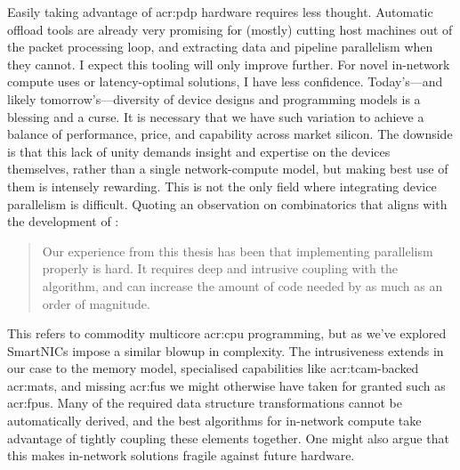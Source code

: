 Easily taking advantage of \gls{acr:pdp} hardware requires less thought.
Automatic offload tools are already very promising for (mostly) cutting host machines out of the packet processing loop, and extracting data and pipeline parallelism when they cannot.
I expect this tooling will only improve further.
For novel in-network compute uses or latency-optimal solutions, I have less confidence.
Today's---and likely tomorrow's---diversity of device designs and programming models is a blessing and a curse.
It is necessary that we have such variation to achieve a balance of performance, price, and capability across market silicon.
The downside is that this lack of unity demands insight and expertise on the devices themselves, rather than a single network-compute model, but making best use of them is intensely rewarding.
This is not the only field where integrating device parallelism is difficult.
Quoting an observation on combinatorics that aligns with the development of \approachshort:
%
%
%
%
\begin{quotation}
	\noindent
	Our experience from this thesis has been that implementing parallelism properly is hard. It requires deep and intrusive coupling with the algorithm, and can increase the amount of code needed by as much as an order of magnitude.
	
	\hfill\parencite[p.~214]{ciaran-phd}
\end{quotation}
This refers to commodity multicore \gls{acr:cpu} programming, but as we've explored SmartNICs impose a similar blowup in complexity.
The intrusiveness extends in our case to the memory model, specialised capabilities like \gls{acr:tcam}-backed \glspl{acr:mat}, and missing \glspl{acr:fu} we might otherwise have taken for granted such as \glspl{acr:fpu}.
Many of the required data structure transformations cannot be automatically derived, and the best algorithms for in-network compute take advantage of tightly coupling these elements together.
One might also argue that this makes in-network solutions fragile against future hardware.
%

